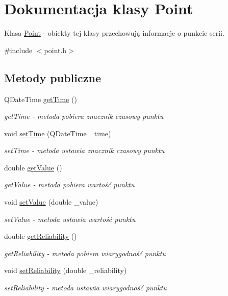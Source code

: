 \hypertarget{class_point}{\section{Dokumentacja klasy Point}
\label{class_point}
}


Klasa \hyperlink{class_point}{Point} -\/ obiekty tej klasy przechowują informacje o punkcie serii.  




{\ttfamily \#include $<$point.\+h$>$}

\subsection*{Metody publiczne}
\begin{DoxyCompactItemize}
\item 
Q\+Date\+Time \hyperlink{class_point_aee53ff6b0e8d20a149fae879ff7c6e4c}{get\+Time} ()
\begin{DoxyCompactList}\small\item\em get\+Time -\/ metoda pobiera znacznik czasowy punktu \end{DoxyCompactList}\item 
void \hyperlink{class_point_a930173774856f75664596a84c9b72c3f}{set\+Time} (Q\+Date\+Time \+\_\+time)
\begin{DoxyCompactList}\small\item\em set\+Time -\/ metoda ustawia znacznik czasowy punktu \end{DoxyCompactList}\item 
double \hyperlink{class_point_ae63f2e3c115c31681526d8f5f8620c0f}{get\+Value} ()
\begin{DoxyCompactList}\small\item\em get\+Value -\/ metoda pobiera wartość punktu \end{DoxyCompactList}\item 
void \hyperlink{class_point_a048c1d16cb855b4989454331dcd42e19}{set\+Value} (double \+\_\+value)
\begin{DoxyCompactList}\small\item\em set\+Value -\/ metoda ustawia wartość punktu \end{DoxyCompactList}\item 
double \hyperlink{class_point_a7337f6e918f0e33c67517f02d9b0125c}{get\+Reliability} ()
\begin{DoxyCompactList}\small\item\em get\+Reliability -\/ metoda pobiera wiarygodność punktu \end{DoxyCompactList}\item 
void \hyperlink{class_point_a123692f9126c70a9e436a1a60bc86213}{set\+Reliability} (double \+\_\+reliability)
\begin{DoxyCompactList}\small\item\em set\+Reliability -\/ metoda ustawia wiarygodność punktu \end{DoxyCompactList}\end{DoxyCompactItemize}


